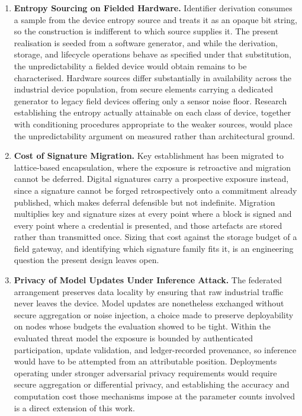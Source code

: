 \begin{enumerate}
\item \textbf{Entropy Sourcing on Fielded Hardware.} Identifier derivation consumes a sample from the device entropy source and treats it as an opaque bit string, so the construction is indifferent to which source supplies it. The present realisation is seeded from a software generator, and while the derivation, storage, and lifecycle operations behave as specified under that substitution, the unpredictability a fielded device would obtain remains to be characterised. Hardware sources differ substantially in availability across the industrial device population, from secure elements carrying a dedicated generator to legacy field devices offering only a sensor noise floor. Research establishing the entropy actually attainable on each class of device, together with conditioning procedures appropriate to the weaker sources, would place the unpredictability argument on measured rather than architectural ground.

\item \textbf{Cost of Signature Migration.} Key establishment has been migrated to lattice-based encapsulation, where the exposure is retroactive and migration cannot be deferred. Digital signatures carry a prospective exposure instead, since a signature cannot be forged retrospectively onto a commitment already published, which makes deferral defensible but not indefinite. Migration multiplies key and signature sizes at every point where a block is signed and every point where a credential is presented, and those artefacts are stored rather than transmitted once. Sizing that cost against the storage budget of a field gateway, and identifying which signature family fits it, is an engineering question the present design leaves open.

\item \textbf{Privacy of Model Updates Under Inference Attack.} The federated arrangement preserves data locality by ensuring that raw industrial traffic never leaves the device. Model updates are nonetheless exchanged without secure aggregation or noise injection, a choice made to preserve deployability on nodes whose budgets the evaluation showed to be tight. Within the evaluated threat model the exposure is bounded by authenticated participation, update validation, and ledger-recorded provenance, so inference would have to be attempted from an attributable position. Deployments operating under stronger adversarial privacy requirements would require secure aggregation or differential privacy, and establishing the accuracy and computation cost those mechanisms impose at the parameter counts involved is a direct extension of this work.


\end{enumerate}
